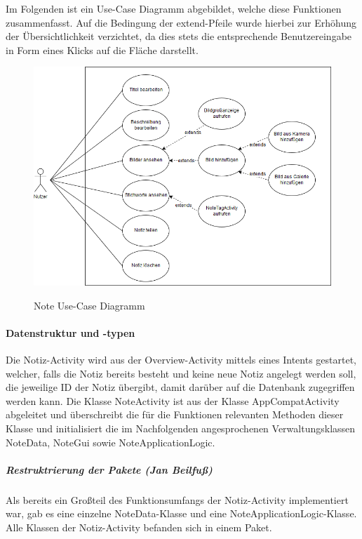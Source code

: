 Im Folgenden ist ein Use-Case Diagramm abgebildet, welche diese Funktionen zusammenfasst. Auf die Bedingung der extend-Pfeile wurde hierbei zur Erhöhung der Übersichtlichkeit verzichtet, da dies stets die entsprechende Benutzereingabe in Form eines Klicks auf die Fläche darstellt.

\begin{figure}[H]
\centering
\begin{minipage}[t]{1\textwidth} %
\caption{Note Use-Case Diagramm} %
\includegraphics[width=1 \textwidth]{img/noteUseCase}\\ %
\end{minipage}
\end{figure}

\paragraph{Datenstruktur und -typen}
Die Notiz-Activity wird aus der Overview-Activity mittels eines Intents gestartet, welcher, falls die Notiz bereits besteht und keine neue Notiz angelegt werden soll, die jeweilige ID der Notiz übergibt, damit darüber auf die Datenbank zugegriffen werden kann. Die Klasse NoteActivity ist aus der Klasse AppCompatActivity abgeleitet und überschreibt die für die Funktionen relevanten Methoden dieser Klasse und initialisiert die im Nachfolgenden angesprochenen Verwaltungsklassen NoteData, NoteGui sowie NoteApplicationLogic.

\subparagraph{Restruktrierung der Pakete (Jan Beilfuß)}
Als bereits ein Großteil des Funktionsumfangs der Notiz-Activity implementiert war, gab es eine einzelne NoteData-Klasse und eine NoteApplicationLogic-Klasse. Alle Klassen der Notiz-Activity befanden sich in einem Paket.

